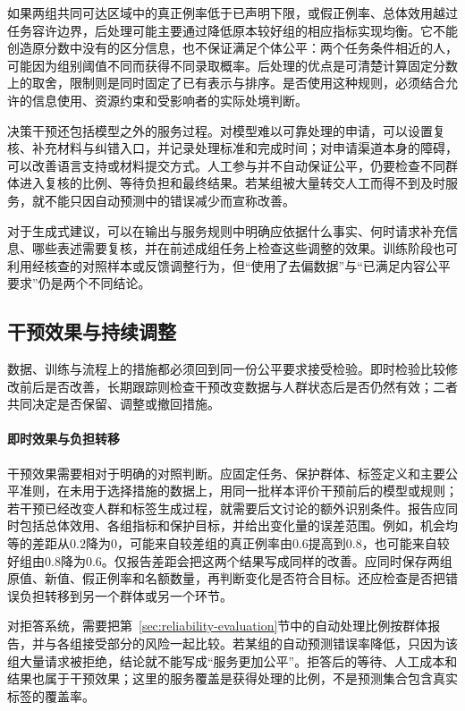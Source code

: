如果两组共同可达区域中的真正例率低于已声明下限，或假正例率、总体效用越过任务容许边界，后处理可能主要通过降低原本较好组的相应指标实现均衡。它不能创造原分数中没有的区分信息，也不保证满足个体公平：两个任务条件相近的人，可能因为组别阈值不同而获得不同录取概率。后处理的优点是可清楚计算固定分数上的取舍，限制则是同时固定了已有表示与排序。是否使用这种规则，必须结合允许的信息使用、资源约束和受影响者的实际处境判断。

决策干预还包括模型之外的服务过程。对模型难以可靠处理的申请，可以设置复核、补充材料与纠错入口，并记录处理标准和完成时间；对申请渠道本身的障碍，可以改善语言支持或材料提交方式。人工参与并不自动保证公平，仍要检查不同群体进入复核的比例、等待负担和最终结果。若某组被大量转交人工而得不到及时服务，就不能只因自动预测中的错误减少而宣称改善。

对于生成式建议，可以在输出与服务规则中明确应依据什么事实、何时请求补充信息、哪些表述需要复核，并在前述成组任务上检查这些调整的效果。训练阶段也可利用经核查的对照样本或反馈调整行为，但“使用了去偏数据”与“已满足内容公平要求”仍是两个不同结论。

\subsection{干预效果与持续调整}
\label{sec:fairness-intervention-evaluation}
\label{sec:fairness-long-term}

数据、训练与流程上的措施都必须回到同一份公平要求接受检验。即时检验比较修改前后是否改善，长期跟踪则检查干预改变数据与人群状态后是否仍然有效；二者共同决定是否保留、调整或撤回措施。

\paragraph{即时效果与负担转移}

干预效果需要相对于明确的对照判断。应固定任务、保护群体、标签定义和主要公平准则，在未用于选择措施的数据上，用同一批样本评价干预前后的模型或规则；若干预已经改变人群和标签生成过程，就需要后文讨论的额外识别条件。报告应同时包括总体效用、各组指标和保护目标，并给出变化量的误差范围。例如，机会均等的差距从$0.2$降为0，可能来自较差组的真正例率由$0.6$提高到$0.8$，也可能来自较好组由$0.8$降为$0.6$。仅报告差距会把这两个结果写成同样的改善。应同时保存两组原值、新值、假正例率和名额数量，再判断变化是否符合目标。还应检查是否把错误负担转移到另一个群体或另一个环节。

对拒答系统，需要把第~\ref{sec:reliability-evaluation}节中的自动处理比例按群体报告，并与各组接受部分的风险一起比较。若某组的自动预测错误率降低，只因为该组大量请求被拒绝，结论就不能写成“服务更加公平”。拒答后的等待、人工成本和结果也属于干预效果；这里的服务覆盖是获得处理的比例，不是预测集合包含真实标签的覆盖率。

